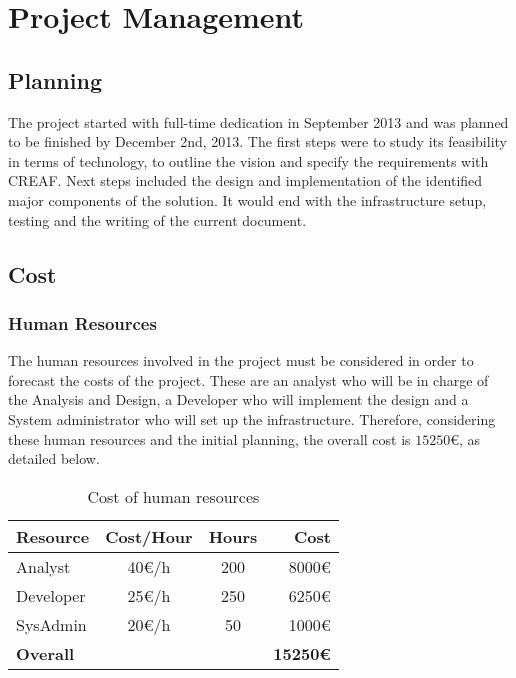 \chapter{Project Management}

\section{Planning}

The project started with full-time dedication in September 2013 and was planned to be finished by December 2nd, 2013. The first steps were to study its feasibility in terms of technology, to outline the vision and specify the requirements with CREAF. Next steps included the design and implementation of the identified major components of the solution. It would end with the infrastructure setup, testing and the writing of the current document.



\section{Cost}

\subsection*{Human Resources}

The human resources involved in the project must be considered in order to forecast the costs of the project. These are an analyst who will be in charge of the Analysis and Design, a Developer who will implement the design and a System administrator who will set up the infrastructure. Therefore, considering these human resources and the initial planning, the overall cost is $15250\euro{}$, as detailed below.

\begin{table}[H]
    \centering
    \begin{tabular}{|l|c|c|r|}
    \hline
    \textbf{Resource}  & \textbf{Cost/Hour}  & \textbf{Hours}  & \textbf{Cost} \\ \hline
    Analyst            & 40\euro{}/h         & 200             & 8000\euro{}   \\ \hline
    Developer          & 25\euro{}/h         & 250             & 6250\euro{}   \\ \hline
    SysAdmin           & 20\euro{}/h         & 50              & 1000\euro{}    \\ \hline
    \textbf{Overall}   &                     &                 & \textbf{15250\euro{}} \\ \hline
    \end{tabular}
    \caption{Cost of human resources}
    \label{tab:human_cost}
\end{table}

